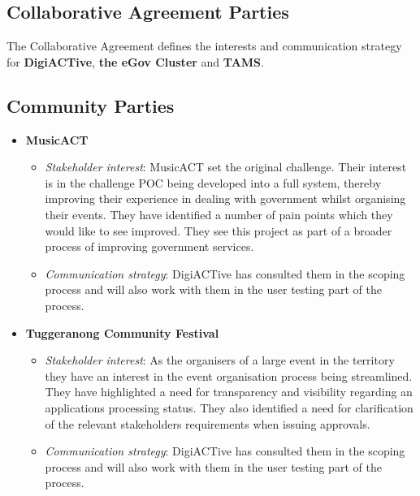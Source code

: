 \documentclass[12pt,a4paper,twosided]{article}
\begin{document}
\subsection{Collaborative Agreement
Parties}\label{collaborative-agreement-parties}

The Collaborative Agreement defines the interests and communication
strategy for \textbf{DigiACTive}, \textbf{the eGov Cluster} and
\textbf{TAMS}.

\subsection{Community Parties}\label{community-parties}

\begin{itemize}
\itemsep1pt\parskip0pt
\item
  \textbf{MusicACT}

  \begin{itemize}
  \itemsep1pt\parskip0pt
  \item
    \emph{Stakeholder interest}: MusicACT set the original challenge.
    Their interest is in the challenge POC being developed into a full
    system, thereby improving their experience in dealing with
    government whilst organising their events. They have identified a
    number of pain points which they would like to see improved. They
    see this project as part of a broader process of improving
    government services.
  \item
    \emph{Communication strategy}: DigiACTive has consulted them in the
    scoping process and will also work with them in the user testing
    part of the process.
  \end{itemize}
\item
  \textbf{Tuggeranong Community Festival}

  \begin{itemize}
  \itemsep1pt\parskip0pt
  \item
    \emph{Stakeholder interest}: As the organisers of a large event in
    the territory they have an interest in the event organisation
    process being streamlined. They have highlighted a need for
    transparency and visibility regarding an applications processing
    status. They also identified a need for clarification of the
    relevant stakeholders requirements when issuing approvals.
  \item
    \emph{Communication strategy}: DigiACTive has consulted them in the
    scoping process and will also work with them in the user testing
    part of the process.
  \end{itemize}
\end{itemize}
\end{document}
